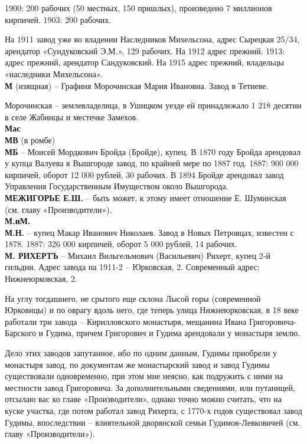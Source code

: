 1900: 200 рабочих (50 местных, 150 пришлых), произведено 7 миллионов кирпичей. 1903: 200 рабочих. 

На 1911 завод уже во владении Наследников Михельсона, адрес Сырецкая 25/34, арендатор «Сундуковский Э.М.», 129 рабочих. На 1912 адрес прежний. 1913: адрес прежний, арендатор Сандуковский. На 1915 адрес прежний, владельцы «наследники Михельсона».\\

\noindent\textbf{М} (изящная) – Графиня Морочинская Мария Ивановна. Завод в Тетиеве.

Морочинская – землевладелица, в Ушицком уезде ей принадлежало 1 218 десятин в селе Жабинцы и местечке Замехов.\\

\noindent\textbf{Мас}\\

\noindent\textbf{МВ} (в ромбе)\\

\noindent\textbf{МБ} – Моисей Мордкович Бройда (Бройде), купец. В 1870 году Бройда арендовал у купца Валуева в Вышгороде завод, по крайней мере по 1887 год. 1887: 900 000 кирпичей, оборот 12 000 рублей, 30 рабочих. В 1894 Бройде арендовал завод Управления Государственным Имуществом около Вышгорода.\\ 

\noindent\textbf{МЕЖИГОРЬЕ Е.Ш.} – быть может, к этому имеет отношение Е. Шуминская (см. главу «Производители»).\\

\noindent\textbf{М.иМ.}\\

\noindent\textbf{М.Н.} – купец Макар Иванович Николаев. Завод в Новых Петровцах, известен с 1878. 1887: 326 000 кирпичей, оборот 5 000 рублей, 14 рабочих.\\

\noindent\textbf{М. РИХЕРТЪ} – Михаил Вильгельмович (Васильевич) Рихерт, купец 2-й гильдии. Адрес завода на 1911-2 – Юрковская, 2. Современный адрес: Нижнеюрковская, 2.

На углу тогдашнего, не срытого еще склона Лысой горы (современной Юрковицы) и по оврагу вдоль него, где теперь улица Нижнеюрковская, в 18 веке работали три завода – Кирилловского монастыря, мещанина Ивана Григоровича-Барского и Гудима, причем Григорович и Гудима арендовали у монастыря землю. 

Дело этих заводов запутанное, ибо по одним данным, Гудимы приобрели у монастыря завод, по документам же монастырский завод и завод Гудимы существовали одновременно, при этом мне неясно, как подружить с ними на местности завод Григоровича. За дополнительными сведениями, или путаницей, отсылаю вас ко главе «Производители», однако точно можно считать, что на куске участка, где потом работал завод Рихерта, с 1770-х годов существовал завод Гудимы, впоследствии – влиятельной дворянской семьи Гудимов-Левковичей (см. главу «Производители»). 

